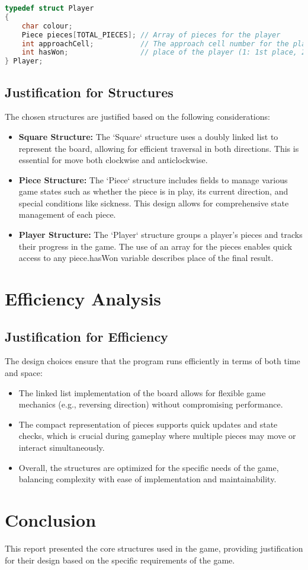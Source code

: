 \documentclass[a4paper,11pt]{article}
\begin{document}
\begin{lstlisting}[language=C, caption={Structure to represent a player and their pieces}]
typedef struct Player
{
    char colour;
    Piece pieces[TOTAL_PIECES]; // Array of pieces for the player
    int approachCell;           // The approach cell number for the player
    int hasWon;                 // place of the player (1: 1st place, 2: 2nd place, 3: 3rd place, 4: 4th place)
} Player;
\end{lstlisting}

\subsection{Justification for Structures}
The chosen structures are justified based on the following considerations:

\begin{itemize}
    \item \textbf{Square Structure:} The `Square` structure uses a doubly linked list to represent the board, allowing for efficient traversal in both directions. This is essential for move both clockwise and anticlockwise.
    \item \textbf{Piece Structure:} The `Piece` structure includes fields to manage various game states such as whether the piece is in play, its current direction, and special conditions like sickness. This design allows for comprehensive state management of each piece.
    \item \textbf{Player Structure:} The `Player` structure groups a player's pieces and tracks their progress in the game. The use of an array for the pieces enables quick access to any piece.hasWon variable describes place of the 
    final result.
\end{itemize}

\section{Efficiency Analysis}

\subsection{Justification for Efficiency}
The design choices ensure that the program runs efficiently in terms of both time and space:

\begin{itemize}
    \item The linked list implementation of the board allows for flexible game mechanics (e.g., reversing direction) without compromising performance.
    \item The compact representation of pieces supports quick updates and state checks, which is crucial during gameplay where multiple pieces may move or interact simultaneously.
    \item Overall, the structures are optimized for the specific needs of the game, balancing complexity with ease of implementation and maintainability.
\end{itemize}

\section{Conclusion}
This report presented the core structures used in the game, providing justification for their design based on the specific requirements of the game. 
\end{document}
